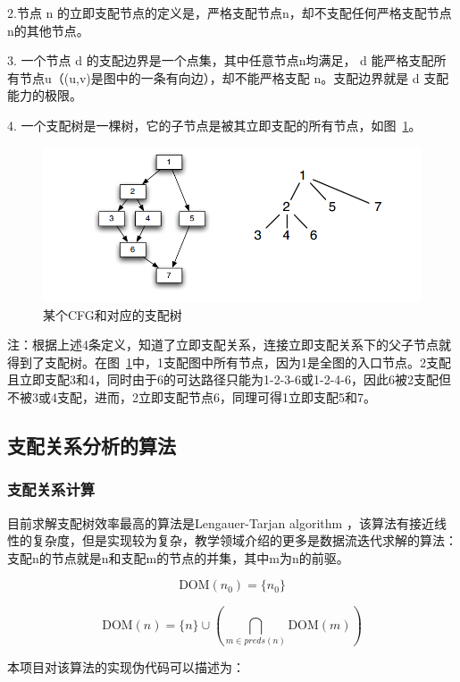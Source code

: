 2.节点 n 的立即支配节点的定义是，严格支配节点n，却不支配任何严格支配节点n的其他节点。

3. 一个节点 d 的支配边界是一个点集，其中任意节点n均满足， d 能严格支配所有节点u（(u,v)是图中的一条有向边），却不能严格支配 n。支配边界就是 d 支配能力的极限。

4. 一个支配树是一棵树，它的子节点是被其立即支配的所有节点，如图~\ref{fig:domTree}。

\begin{figure}[htb]
  \centering
  \includegraphics[width=1.0\textwidth]{figures/dom.png}
  \caption{某个CFG和对应的支配树}
  \label{fig:domTree}
\end{figure}

注：根据上述4条定义，知道了立即支配关系，连接立即支配关系下的父子节点就得到了支配树。在图~\ref{fig:domTree}中，1支配图中所有节点，因为1是全图的入口节点。2支配且立即支配3和4，同时由于6的可达路径只能为1-2-3-6或1-2-4-6，因此6被2支配但不被3或4支配，进而，2立即支配节点6，同理可得1立即支配5和7。

\subsection{支配关系分析的算法}

\subsubsection{支配关系计算}

目前求解支配树效率最高的算法是Lengauer-Tarjan algorithm \cite{10.1145/357062.357071}，该算法有接近线性的复杂度，但是实现较为复杂，教学领域介绍的更多是数据流迭代求解的算法\cite{10.1145/1255450.1255452}：支配n的节点就是n和支配m的节点的并集，其中m为n的前驱。

$$
\text{DOM}(n_0)=\{n_0\}
$$

$$
\text{DOM}(n)=\{n\} \cup\left ( \mathop{\bigcap}\limits_{m \in preds(n)}  \text{DOM}(m) \right)
$$

本项目对该算法的实现伪代码可以描述为：

